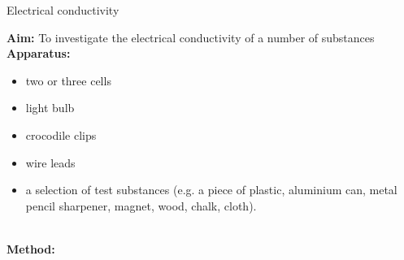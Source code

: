 \label{m38706*secfhsst!!!underscore!!!id357}
            \begin{g_experiment}{Electrical conductivity}{
            \nopagebreak
            \label{m38706*id66151}\noindent{} \textbf{Aim: } To investigate the electrical conductivity of a number of substances \\
      \label{m38706*id66166}\noindent{}\textbf{Apparatus:} \\
\begin{minipage}{.5\textwidth}
      \label{m38706*id66175}\begin{itemize}[noitemsep]
            \label{m38706*uid95}\item two or three cells
\label{m38706*uid96}\item light bulb
\label{m38706*uid97}\item crocodile clips
\label{m38706*uid98}\item wire leads
\label{m38706*uid99}\item a selection of test substances (e.g. a piece of plastic, aluminium can, metal pencil sharpener, magnet, wood, chalk, cloth).
\end{itemize}
\end{minipage}
\begin{minipage}{.5\textwidth}
      \label{m38706*id66241}
    \setcounter{subfigure}{0}
	\begin{figure}[H] %
    \begin{center}
    \end{center}
 \end{figure}  
\end{minipage}    \\
      \label{m38706*id66251}\noindent{}\textbf{Method:}
      \label{m38706*id66260}\begin{enumerate}[noitemsep, label=\textbf{\arabic*}. ] 

\end{enumerate}}
\end{g_experiment}
